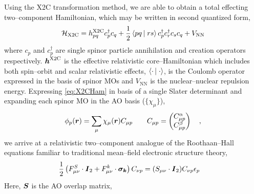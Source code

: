 Using the X2C transformation method, we are able to obtain a total effecting
two--component Hamiltonian, which may be written in second quantized form,
\begin{equation}
\mathcal{H}_\mathrm{X2C} = h_{pq}^\mathrm{X2C}c_p^\dagger c_q + 
  \frac{1}{2} \left\langle pq \left\vert\right. rs \right\rangle c_p^\dagger c_r^\dagger c_s c_q + V_\mathrm{NN}
  \label{eq:X2CHam}
\end{equation}
where $c_p$ and $c_p^\dagger$ are single spinor particle annihilation and
creation operators respectively. $\boldsymbol{h}^\mathrm{X2C}$ is the effective
relativistic core--Hamiltonian which includes both spin--orbit and scalar
relativistic effects, $\left\langle \cdot \left\vert\right. \cdot \right\rangle$, is the Coulomb operator expressed
in the basis of spinor MOs and $V_\mathrm{NN}$ is the nuclear--nuclear repulsion
energy. Expressing \cref{eq:X2CHam} in basis of a single Slater determinant and
expanding each spinor MO in the AO basis ($\lbrace \chi_\mu \rbrace$),
\begin{equation}
\phi_p ( \boldsymbol{r} ) = \sum_\mu \chi_\mu(\boldsymbol{r}) C_{\mu p}
\qquad
C_{\mu p} = \begin{pmatrix}
C_{\mu p}^\alpha \\ C_{\mu p}^\beta
\end{pmatrix}
\quad , \label{eq:AO2MO}
\end{equation}
we arrive at a relativistic two--component analogue of the Roothaan--Hall
equations familiar to traditional mean--field electronic structure theory,
\begin{align}
&\frac{1}{2}\left(
  F^S_{\mu\nu} \cdot \boldsymbol{I}_2 + F^k_{\mu\nu} \cdot \boldsymbol{\sigma_k}
\right) C_{\nu p} = (S_{\mu\nu}\cdot \boldsymbol{I}_2) C_{\nu p}
\epsilon_p\label{eq:Roothaan}
\end{align}
Here, $\boldsymbol{S}$ is the AO overlap matrix, 
